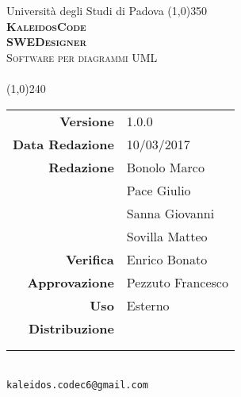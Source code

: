 \documentclass[a4paper,12pt]{article}
\author{KaleidosCode}
\date{10/03/2017}	%
\date{\today}
\begin{document}
	\begin{titlepage}
		\centering Università degli Studi di Padova
		\line(1,0){350}\\
		\vspace{0.4cm}
		{\bfseries\scshape\LARGE KaleidosCode\\}
		\vspace{0.4cm}
		{\bfseries\scshape\LARGE SWEDesigner\\}
		{\scshape\Large Software per diagrammi UML\\}
		\vspace{1cm}
		{\scshape\Large \glossarioi\ \\}		%
		\vspace{1.4cm}
		\logo
		\vspace{1.2cm}
		\line(1,0){240}\\
		\begin{tabular}{r|l}
			{\hfill \textbf{Versione}} 			& 1.0.0\\
			{\hfill \textbf{Data Redazione}} 	& 10/03/2017\\	%
			{\hfill \textbf{Redazione}} 		& Bonolo Marco\\ & Pace Giulio\\ & Sanna Giovanni\\ & Sovilla Matteo\\
			{\hfill \textbf{Verifica}} 			& Enrico Bonato\\
			{\hfill \textbf{Approvazione}} 		& Pezzuto Francesco\\
			{\hfill \textbf{Uso}} 				& Esterno\\
			{\hfill \textbf{Distribuzione}} 	& \vardanega \\ & \cardin \\ & \proponente\\
		\end{tabular}\\
		\vspace{2cm}
		\texttt{kaleidos.codec6@gmail.com}
	\end{titlepage}
	
	\pagestyle{myfront}
	\newpage
		
	\newpage
	\pagestyle{mymain}
		\glsaddall
		\printglossary[style=myaltlistgroup, title=, toctitle=Glossario dei termini]

	\label{LastPage}
\end{document}

